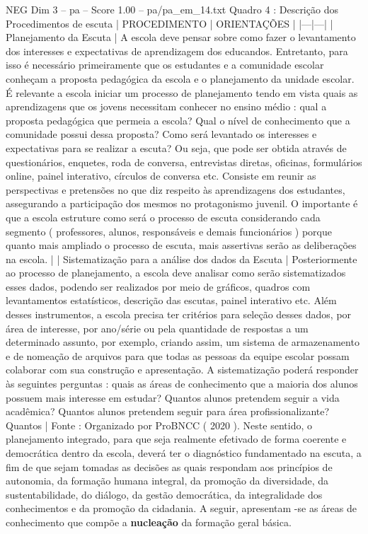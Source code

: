 \begin{textsample}{NEG Dim 3 – pa – Score 1.00 – pa/pa\_em\_14.txt}  \label{ex:f3_neg_059}
Quadro 4 : Descrição dos Procedimentos de escuta | PROCEDIMENTO | ORIENTAÇÕES | |---|---| | Planejamento da Escuta | A escola deve pensar sobre como fazer o levantamento dos interesses e expectativas de aprendizagem dos educandos.
Entretanto, para isso é necessário primeiramente que os estudantes e a comunidade escolar conheçam a proposta pedagógica da escola e o planejamento da unidade escolar.
É relevante a escola iniciar um processo de planejamento tendo em vista quais as aprendizagens que os jovens necessitam conhecer no ensino médio : qual a proposta pedagógica que permeia a escola?
Qual o nível de conhecimento que a comunidade possui dessa proposta?
Como será levantado os interesses e expectativas para se realizar a escuta?
Ou seja, que pode ser obtida através de questionários, enquetes, roda de conversa, entrevistas diretas, oficinas, formulários online, painel interativo, círculos de conversa etc.
Consiste em reunir as perspectivas e pretensões no que diz respeito às aprendizagens dos estudantes, assegurando a participação dos mesmos no protagonismo juvenil.
O importante é que a escola estruture como será o processo de escuta considerando cada segmento ( professores, alunos, responsáveis e demais funcionários ) porque quanto mais ampliado o processo de escuta, mais assertivas serão as deliberações na escola. | | Sistematização para a análise dos dados da Escuta | Posteriormente ao processo de planejamento, a escola deve analisar como serão sistematizados esses dados, podendo ser realizados por meio de gráficos, quadros com levantamentos estatísticos, descrição das escutas, painel interativo etc.
Além desses instrumentos, a escola precisa ter critérios para seleção desses dados, por área de interesse, por ano/série ou pela quantidade de respostas a um determinado assunto, por exemplo, criando assim, um sistema de armazenamento e de nomeação de arquivos para que todas as pessoas da equipe escolar possam colaborar com sua construção e apresentação.
A sistematização poderá responder às seguintes perguntas : quais as áreas de conhecimento que a maioria dos alunos possuem mais interesse em estudar?
Quantos alunos pretendem seguir a vida acadêmica?
Quantos alunos pretendem seguir para área profissionalizante?
Quantos | Fonte : Organizado por ProBNCC ( 2020 ).
Neste sentido, o planejamento integrado, para que seja realmente efetivado de forma coerente e democrática dentro da escola, deverá ter o diagnóstico fundamentado na escuta, a fim de que sejam tomadas as decisões as quais respondam aos princípios de autonomia, da formação humana integral, da promoção da diversidade, da sustentabilidade, do diálogo, da gestão democrática, da integralidade dos conhecimentos e da promoção da cidadania.
A seguir, apresentam -se as áreas de conhecimento que compõe a \textbf{nucleação} da formação geral básica.

\end{textsample}
